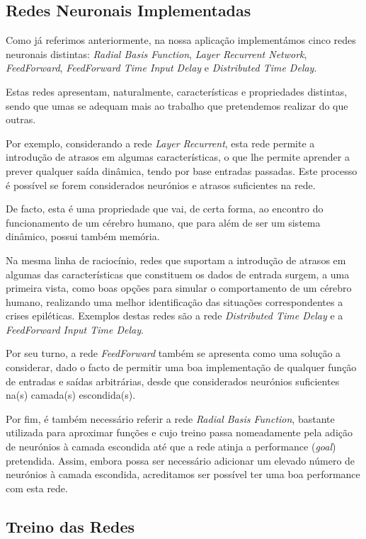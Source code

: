 \documentclass{article}
\begin{document}
\subsection{Redes Neuronais Implementadas}

Como já referimos anteriormente, na nossa aplicação implementámos cinco redes neuronais distintas: \emph{Radial Basis Function}, \emph{Layer Recurrent Network}, \emph{FeedForward}, \emph{FeedForward Time Input Delay} e \emph{Distributed Time Delay}.

Estas redes apresentam, naturalmente, características e propriedades distintas, sendo que umas se adequam mais ao trabalho que pretendemos realizar do que outras.

Por exemplo, considerando a rede \emph{Layer Recurrent}, esta rede permite a introdução de atrasos em algumas características, o que lhe permite aprender a prever qualquer saída dinâmica, tendo por base entradas passadas. Este processo é possível se forem considerados neurónios e atrasos suficientes na rede.

De facto, esta é uma propriedade que vai, de certa forma, ao encontro do funcionamento de um cérebro humano, que para além de ser um sistema dinâmico, possui também memória.

Na mesma linha de raciocínio, redes que suportam a introdução de atrasos em algumas das características que constituem os dados de entrada surgem, a uma primeira vista, como boas opções para simular o comportamento de um cérebro humano, realizando uma melhor identificação das situações correspondentes a crises epiléticas. Exemplos destas redes são a rede \emph{Distributed Time Delay} e a \emph{FeedForward Input Time Delay}.

Por seu turno, a rede \emph{FeedForward} também se apresenta como uma solução a considerar, dado o facto de permitir uma boa implementação de qualquer função de entradas e saídas arbitrárias, desde que considerados neurónios suficientes na(s) camada(s) escondida(s).

Por fim, é também necessário referir a rede \emph{Radial Basis Function}, bastante utilizada para aproximar funções e cujo treino passa nomeadamente pela adição de neurónios à camada escondida até que a rede atinja a performance (\emph{goal}) pretendida. Assim, embora possa ser necessário adicionar um elevado número de neurónios à camada escondida, acreditamos ser possível ter uma boa performance com esta rede.

\subsection{Treino das Redes}
\end{document}
